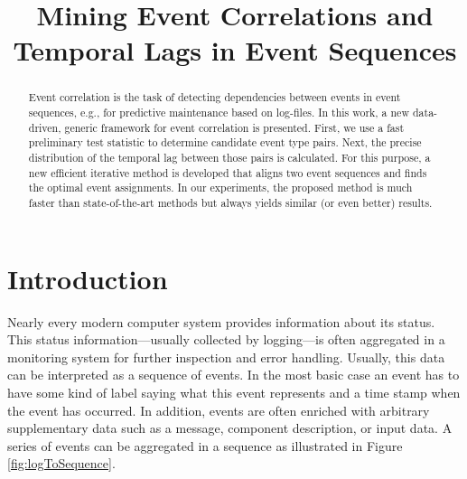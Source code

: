\documentclass[conference]{IEEEtran}
\theoremstyle{examplestyle}
\begin{document}
\begin{acronym}
\end{acronym}



\title{Mining Event Correlations and Temporal Lags in Event Sequences}


\author{
\and
{}
}
 



\maketitle


\begin{abstract}
Event correlation is the task of detecting dependencies between events in event sequences, e.g., for predictive maintenance based on log-files.
In this work, a new data-driven, generic framework for event correlation is presented. 
First, we use a fast preliminary test statistic to determine candidate event type pairs. Next, the precise distribution of the temporal lag between those pairs is calculated. 
For this purpose, a new efficient iterative method is developed that aligns two event sequences and finds the optimal event assignments.
In our experiments, the proposed method is much faster than state-of-the-art methods but always yields similar (or even better) results. 
\end{abstract}






\IEEEpeerreviewmaketitle



\section{Introduction}
Nearly every modern computer system provides information about its status. This status information---usually collected by logging---is often aggregated in a monitoring system for further inspection and error handling. Usually, this data can be interpreted as a sequence of events. In the most basic case an event has to have some kind of label saying what this event represents and a time stamp when the event has occurred. In addition, events are often enriched with arbitrary supplementary data such as a message, component description, or input data. A series of events can be aggregated in a sequence as illustrated in Figure \ref{fig:logToSequence}.
\end{document}
